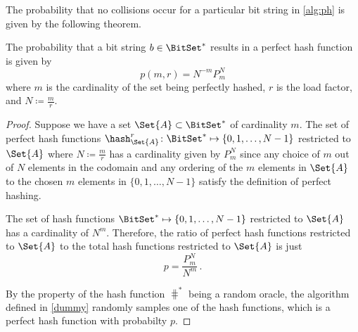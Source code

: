 \documentclass[ ../main.tex]{subfiles}
\begin{document}
The probability that no collisions occur for a particular bit string in \cref{alg:ph} is given by the following theorem.
\begin{theorem}
The probability that a bit string $b \in \BitSet^{*}$ results in a perfect hash function is given by
\begin{equation}
\label{eq:p_m_N}
	p(m,r) = N^{-m} P^{N}_{m}
\end{equation}
where $m$ is the cardinality of the set being perfectly hashed, $r$ is the load factor, and $N \coloneqq \frac{m}{r}$.
\end{theorem}
\begin{proof}
Suppose we have a set $\Set{A} \subset \BitSet^*$ of cardinality $m$.
The set of perfect hash functions $\hash_{\Set{A}}^{r} \colon \BitSet^* \mapsto \{0,1,\ldots,N-1\}$ restricted to $\Set{A}$ where $N \coloneqq \frac{m}{r}$ has a cardinality given by $P^{N}_{m}$ since any choice of $m$ out of $N$ elements in the codomain and any ordering of the $m$ elements in $\Set{A}$ to the chosen $m$ elements in $\{0,1,\ldots,N-1\}$ satisfy the definition of perfect hashing.


The set of hash functions $\BitSet^* \mapsto \{0,1,\ldots,N-1\}$ restricted to $\Set{A}$ has a cardinality of $N^m$.
Therefore, the ratio of perfect hash functions restricted to $\Set{A}$ to the total hash functions restricted to $\Set{A}$ is just
\begin{equation}
	p = \frac{P^{N}_{m}}{N^m}\,.
\end{equation}

By the property of the hash function $\hash^*$ being a random oracle, the algorithm defined in \cref{dummy} randomly samples one of the hash functions, which is a perfect hash function with probabilty $p$.

	

\end{proof}
\end{document}
